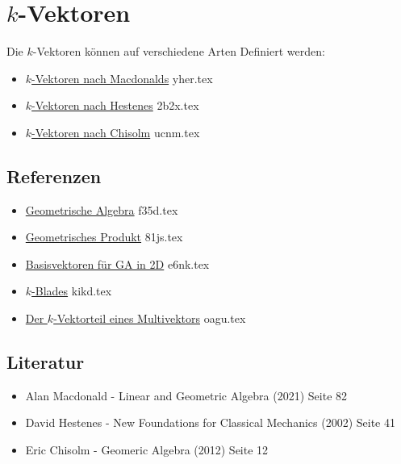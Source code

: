 \documentclass{sajzk}
\begin{document}
\section{\texorpdfstring{$k$-Vektoren}{k-Vektoren}}
\label{93t3}
Die $k$-Vektoren können auf verschiedene Arten Definiert werden:

\begin{itemize}
    \item \href{yher.pdf}{$k$-Vektoren nach Macdonalds} yher.tex
    \item \href{2b2x.pdf}{$k$-Vektoren nach Hestenes} 2b2x.tex
    \item \href{ucnm.pdf}{$k$-Vektoren nach Chisolm} ucnm.tex
\end{itemize}

\subsection{Referenzen}
\begin{itemize}
    \item \href{f35d.pdf}{Geometrische Algebra} f35d.tex
    \item \href{81js.pdf}{Geometrisches Produkt} 81js.tex
    \item \href{e6nk.pdf}{Basisvektoren für GA in 2D} e6nk.tex
    \item \href{kikd.pdf}{$k$-Blades} kikd.tex
    \item \href{oagu.pdf}{Der $k$-Vektorteil eines Multivektors} oagu.tex
\end{itemize}

\subsection{Literatur}
\begin{itemize}
  \item Alan Macdonald - Linear and Geometric Algebra (2021) Seite 82
  \item David Hestenes - New Foundations for Classical Mechanics (2002) Seite 41
  \item Eric Chisolm - Geomeric Algebra (2012) Seite 12
\end{itemize}
\end{document}
